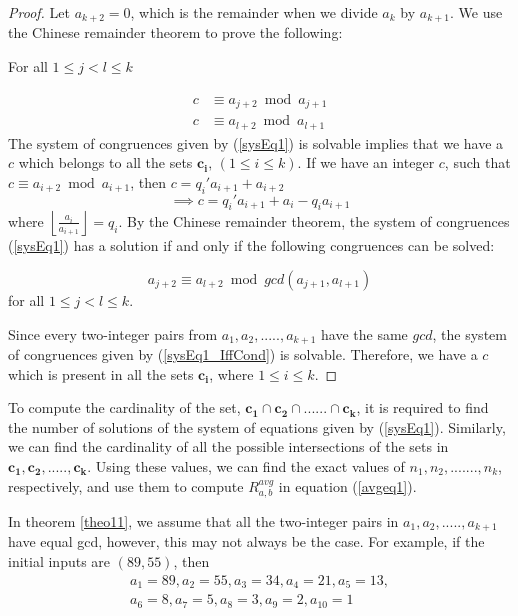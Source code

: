 \documentclass[pdflatex,sn-mathphys-num]{sn-jnl}%
\theoremstyle{thmstyleone}%
\theoremstyle{thmstyletwo}%
\theoremstyle{thmstylethree}%
\begin{document}
\begin{proof}
Let $a_{k+2}=0$, which is the remainder when we divide $a_k$ by $a_{k+1}$. We use the Chinese remainder theorem to prove the following:
\par
For all
$1\le j < l \le k$

\begin{equation}\label{sysEq1}
\begin{split}
 c & \equiv a_{j+2} \bmod a_{j+1}
\\
c &\equiv a_{l+2} \bmod a_{l+1}
\end{split}
\end{equation}
The system of congruences given by (\ref{sysEq1}) is solvable implies that 
we have a $c$ which belongs to all the sets $\mathbf{c_i}, \,(1\le i \le k)$. If we have an integer $c$, such that $c \equiv a_{i+2} \bmod a_{i+1}$, then $c=q_i'a_{i+1}+a_{i+2}$
$$\implies c= q_i'a_{i+1}+a_i-q_ia_{i+1}$$
where $\left\lfloor {\frac{a_i}{a_{i+1}}}\right\rfloor =q_i$. 
By the Chinese remainder theorem, the system of congruences (\ref{sysEq1}) has a solution if and only if the following congruences can be solved:

\begin{equation} \label{sysEq1_IffCond}
a_{j+2} \equiv a_{l+2} \bmod gcd(a_{j+1},a_{l+1})
\end{equation}
for all
$1\le j < l \le k$.
\par Since every two-integer pairs from $a_1,a_2,.....,a_{k+1}$ have the same $gcd$, the system of congruences given by (\ref{sysEq1_IffCond}) is solvable. Therefore, we have a $c$ which is present in all the sets $\mathbf{c_i}$, where $1 \le i \le k$.

\end{proof}
To compute the cardinality of the set, $\mathbf{c_1} \cap \mathbf{c_2} \cap ......\cap \mathbf{c_k}$, it is required  to find the number of solutions of the system of equations given by (\ref{sysEq1}).    Similarly, we can find the cardinality of all the possible intersections of the sets in $\mathbf{c_1},\mathbf{c_2},.....,\mathbf{c_k}$. Using these values, we can find the exact values of $n_1,n_2,.......,n_k$, respectively, and use them to compute $R_{a,b}^{avg}$ in equation (\ref{avgeq1}).
\par 
In theorem \ref{theo11}, we assume that all the two-integer pairs in $a_1,a_2,.....,a_{k+1}$ have equal gcd, however, this may not always be the case. For example, if the initial inputs are $(89,55)$, then \begin{multline}
    a_1=89,a_2=55, a_3=34,a_4=21, a_5=13,\\a_6=8,a_7=5,a_8=3,a_9=2,a_{10}=1
\end{multline}
\end{document}
